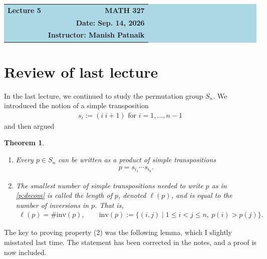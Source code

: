 \documentclass[reqno,11pt]{amsart}
\theoremstyle{definition}
\theoremstyle{plain}
\newtheorem{theorem}{Theorem}[section]
\theoremstyle{remark}
\numberwithin{equation}{section}
\newcommand{\be}{\begin{eqnarray}}
\newcommand{\ee}{\end{eqnarray}}
\begin{document}
\begin{center}
  \colorbox{lightblue}{\begin{minipage}{0.94\textwidth}
    \vspace{0.55em}
    \begin{tabular*}{\textwidth}{@{\extracolsep{\fill}}lr}
      {\color{courseblue}\bfseries\LARGE Lecture 5} & {\color{courseblue}\bfseries\LARGE MATH 327}\\[0.35em]
      & \textbf{Date: Sep. 14, 2026}\\
      & \textbf{Instructor: Manish Patnaik}
    \end{tabular*}
    \vspace{0.45em}
  \end{minipage}}
\end{center}

\par

\setcounter{tocdepth}{1}
\tableofcontents

\newcommand{\inv}{\mathrm{inv}}

\section{Review of last lecture}

In the last lecture, we continued to study the permutation group $S_n$. We introduced the notion of a simple transposition \be s_i := (i\ i+1) \text{ for } i=1, \ldots, n-1 \ee and then argued

\begin{theorem}
	\begin{enumerate}
		\item Every $p \in S_n$ can be written as a product of simple transpositions \be \label{p:decom} p=s_{i_1} \cdots s_{i_k}. \ee
		\item The smallest number of simple transpositions needed to write $p$ as in \eqref{p:decom} is called the length of $p$, denoted $\ell(p)$, and is equal to the number of inversions in $p$. That is,
		\be
		\ell(p)=\#\inv(p),
		\qquad
		\inv(p) := \{ (i,j) \mid 1 \leq i < j \leq n,\ p(i) > p(j) \}.
		\ee
	\end{enumerate}
\end{theorem}

The key to proving property (2) was the following lemma, which I slightly misstated last time. The statement has been corrected in the notes, and a proof is now included.
\end{document}
